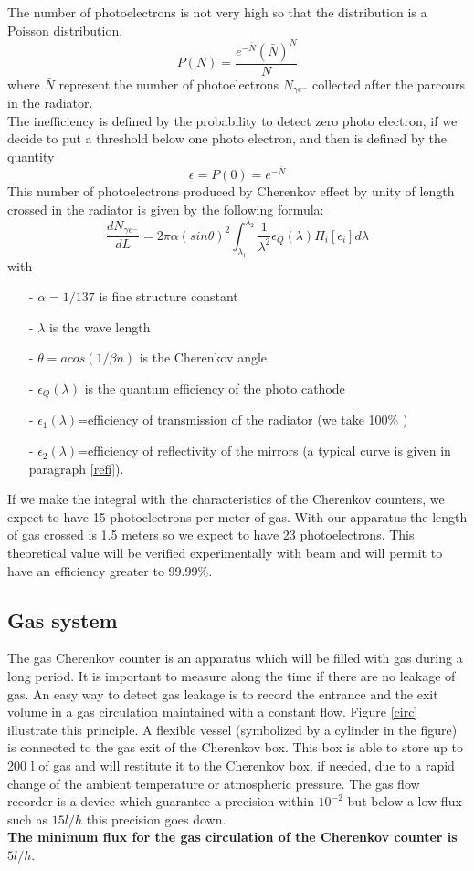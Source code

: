 \documentclass[12pt]{article}
\begin{document}
The number of photoelectrons is not very high so that the 
distribution is a Poisson distribution,
$$P(N)=\frac{e^{- \bar N}(\bar N)^N}{N\!}$$
where $\bar N$ represent the number of photoelectrons 
$N_{\gamma e^-}$ collected after the
parcours in the radiator.\\
The inefficiency is defined by the probability to detect zero photo electron, if
we decide to put a threshold below one photo electron, and then is defined 
by the quantity
\begin{equation}
\epsilon=P(0)=e^{- \bar N}
\label{eff}
\end{equation}
This number of photoelectrons produced by Cherenkov effect by unity of
length crossed in the radiator is given by the following formula:
$$\frac{dN_{\gamma e^-}}{dL}=2\pi \alpha (sin \theta)^2 
\int_{\lambda_1}^{\lambda_2}\frac{1}{\lambda^2}\epsilon_Q(\lambda)
\Pi_i[\epsilon_i]d\lambda$$
with
\begin{itemize}
\item[-]$\alpha=1/137$ is fine structure constant
\item[-]$\lambda$ is the wave length
\item[-]$\theta=acos(1/\beta n)$ is the Cherenkov angle
\item[-]$\epsilon_Q(\lambda)$ is the quantum efficiency of the photo cathode
\item[-]$\epsilon_1(\lambda)$=efficiency of transmission of the radiator (we
take 
100\% )
\item[-]$\epsilon_2(\lambda)$=efficiency of reflectivity of the mirrors 
(a typical curve is given in paragraph \ref{refi}).
\end{itemize}
If we make the integral with the characteristics of the Cherenkov counters, we
expect to have 15 photoelectrons per meter of gas. With our apparatus the
length of gas crossed is 1.5 meters so we expect to have 23 photoelectrons.
 This theoretical value will be verified experimentally with beam and 
will permit to have an efficiency 
greater to 99.99\%.
\newpage
\subsection{Gas system}
\label{des}
The gas Cherenkov counter is an apparatus which will be filled with gas during
a long period. It is important to measure along
the time if there are no leakage of gas. An easy way to detect gas leakage is 
to record the entrance and the exit volume in a gas circulation maintained
with a constant flow. Figure \ref{circ} illustrate this principle.
A flexible vessel (symbolized by a cylinder in the figure) 
is connected to the gas exit of the Cherenkov box. This box is
 able to store up to 200 l 
of gas and will restitute it to the Cherenkov box, if needed, due to a 
rapid change of the ambient
temperature or atmospheric pressure.
 The gas flow recorder is a device which guarantee a
precision within $10^{-2}$ but below a low flux such as $15 l/h$ this 
precision goes down. \\
{\bf The minimum flux for the gas circulation of the 
 Cherenkov counter is $5 l/h$}.\\
\end{document}
